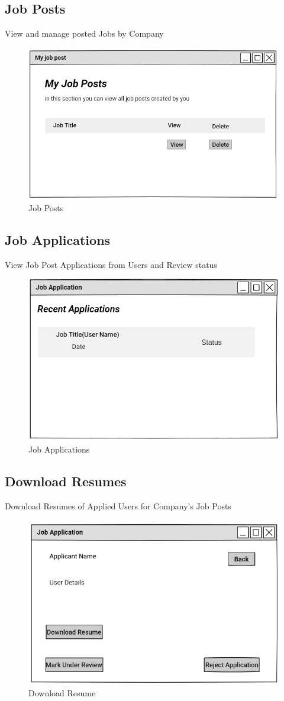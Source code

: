 \documentclass[a4paper,12pt]{report}
\begin{document}
\subsection {Job Posts}
View and manage posted Jobs by Company
\begin{figure}[bph]
	\centering
	\includegraphics[width=.6\linewidth]{img/company/postedjobs}
	\caption{Job Posts}
\end{figure}

\subsection {Job Applications}
View Job Post Applications from Users and Review status
\begin{figure}[bph]
	\centering
	\includegraphics[width=.7\linewidth]{img/company/jobapltns}
	\caption{Job Applications}
\end{figure}
\pagebreak

\subsection {Download Resumes}
Download Resumes of Applied Users for Company's Job Posts
\begin{figure}[bph]
	\centering
	\includegraphics[width=.7\linewidth]{img/company/download_resume}
	\caption{Download Resume}
\end{figure}
\end{document}
